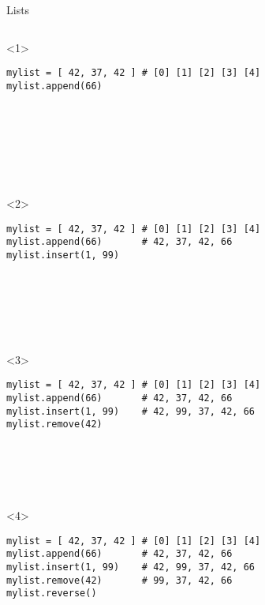 \begin{frame}[fragile]{Lists}

  \begin{center}

  \begin{columns}[onlytextwidth]
    \begin{column}{\textwidth}

      \begin{onlyenv}<1>
        \begin{lstlisting}[style=python,morekeywords={for, in, range, list}]
mylist = [ 42, 37, 42 ] # [0] [1] [2] [3] [4]
mylist.append(66)








       \end{lstlisting}
      \end{onlyenv}

      \begin{onlyenv}<2>
        \begin{lstlisting}[style=python,morekeywords={for, in, range, list}]
mylist = [ 42, 37, 42 ] # [0] [1] [2] [3] [4]
mylist.append(66)       # 42, 37, 42, 66
mylist.insert(1, 99)







       \end{lstlisting}
      \end{onlyenv}

      \begin{onlyenv}<3>
        \begin{lstlisting}[style=python,morekeywords={for, in, range, list}]
mylist = [ 42, 37, 42 ] # [0] [1] [2] [3] [4]
mylist.append(66)       # 42, 37, 42, 66
mylist.insert(1, 99)    # 42, 99, 37, 42, 66
mylist.remove(42)






       \end{lstlisting}
      \end{onlyenv}

      \begin{onlyenv}<4>
        \begin{lstlisting}[style=python,morekeywords={for, in, range, list}]
mylist = [ 42, 37, 42 ] # [0] [1] [2] [3] [4]
mylist.append(66)       # 42, 37, 42, 66
mylist.insert(1, 99)    # 42, 99, 37, 42, 66
mylist.remove(42)       # 99, 37, 42, 66
mylist.reverse()






\end{lstlisting}
\end{onlyenv}
\end{column}
\end{columns}
\end{center}
\end{frame}

